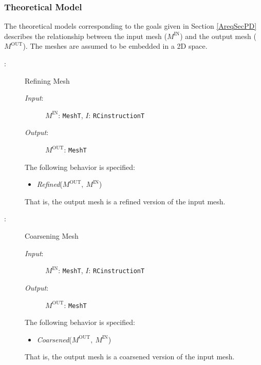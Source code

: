 \documentclass[12pt,titlepage]{article}
\begin{document}
\subsubsection{Theoretical Model}
The theoretical models corresponding to the goals given in Section \ref{AreqSecPD} describes the relationship between the input mesh ($M^{\mbox{IN}}$) and the output mesh ($M^{\mbox{OUT}}$). The meshes are assumed to be embedded in a 2D space. 
\begin{description}
\item[ \tmthetmnum \label{tmRefining}:] Refining Mesh
\begin{description}
\item [\emph{Input}:] $M^{\mbox{IN}}$: {\tt MeshT}, $I$: {\tt RCinstructionT}
\item [\emph{Output}:] $M^{\mbox{OUT}}$: {\tt MeshT}
\end{description}
The following behavior is specified: 
\begin{itemize}
\item {\it Refined}($M^{\mbox{OUT}},\ M^{\mbox{IN}}$)
\end{itemize}
That is, the output mesh is a refined version of the input mesh.
\item[ \tmthetmnum \label{tmCoarsening}:] Coarsening Mesh
\begin{description}
\item [\emph{Input}:] $M^{\mbox{IN}}$: {\tt MeshT}, $I$: {\tt RCinstructionT}
\item [\emph{Output}:] $M^{\mbox{OUT}}$: {\tt MeshT}
\end{description}
The following behavior is specified: 
\begin{itemize}
\item {\it Coarsened}($M^{\mbox{OUT}},\ M^{\mbox{IN}}$)
\end{itemize}
That is, the output mesh is a coarsened version of the input mesh.
\end{description}
\end{document}
